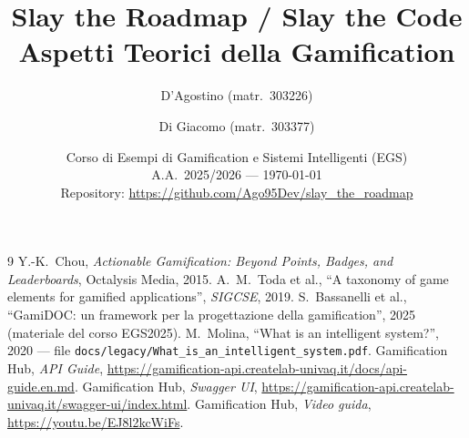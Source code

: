 \documentclass[a4paper,11pt]{report}
\title{Slay the Roadmap / Slay the Code\\Aspetti Teorici della Gamification}
\author{D'Agostino (matr.\ 303226) \and Di Giacomo (matr.\ 303377)}
\date{Corso di Esempi di Gamification e Sistemi Intelligenti (EGS)\\A.A.\ 2025/2026 --- \today\\[1ex]
\small Repository: \url{https://github.com/Ago95Dev/slay_the_roadmap}}
\begin{document}
\maketitle
\tableofcontents









\begin{thebibliography}{9}
 Y.-K.\ Chou, \textit{Actionable Gamification: Beyond Points, Badges, and Leaderboards}, Octalysis Media, 2015.
 A.\ M.\ Toda et al., ``A taxonomy of game elements for gamified applications'', \textit{SIGCSE}, 2019.
 S.\ Bassanelli et al., ``GamiDOC: un framework per la progettazione della gamification'', 2025 (materiale del corso EGS2025).
 M.\ Molina, ``What is an intelligent system?'', 2020 --- file \texttt{docs/legacy/What\_is\_an\_intelligent\_system.pdf}.
 Gamification Hub, \textit{API Guide}, \url{https://gamification-api.createlab-univaq.it/docs/api-guide.en.md}.
 Gamification Hub, \textit{Swagger UI}, \url{https://gamification-api.createlab-univaq.it/swagger-ui/index.html}.
 Gamification Hub, \textit{Video guida}, \url{https://youtu.be/EJ8l2kcWiFs}.
\end{thebibliography}
\end{document}
